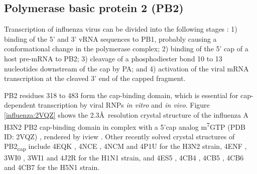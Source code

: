 
\subsection{Polymerase basic protein 2 (PB2)}

Transcription of influenza virus can be divided into the following stages \citep{1236}: 1) binding of the 5' and 3' vRNA sequences to PB1, probably causing a conformational change in the polymerase complex; 2) binding of the 5' cap of a host pre-mRNA to PB2; 3) cleavage of a phosphodiester bond 10 to 13 nucleotides downstream of the cap by PA; and 4) activation of the viral mRNA transcription at the cleaved 3' end of the capped fragment.

PB2 residues 318 to 483 form the cap-binding domain, which is essential for cap-dependent transcription by viral RNPs \textit{in vitro} and \textit{in vivo}. Figure \ref{influenza:2VQZ} shows the 2.3\AA\ resolution crystal structure of the influenza A H3N2 PB2 cap-binding domain in complex with a 5'cap analog m\textsuperscript{7}GTP (PDB ID: 2VQZ) \citep{1192}, rendered by iview \citep{1366}. Other recently solved crystal structures of PB2\textsubscript{cap} include 4EQK \citep{1554}, 4NCE \citep{1558}, 4NCM \citep{1558} and 4P1U \citep{1558} for the H3N2 strain, 4ENF \citep{1554}, 3WI0 \citep{1546}, 3WI1 \citep{1546} and 4J2R \citep{1555} for the H1N1 strain, and 4ES5 \citep{1554}, 4CB4 \citep{1557}, 4CB5 \citep{1557}, 4CB6 \citep{1557} and 4CB7 \citep{1557} for the H5N1 strain.

